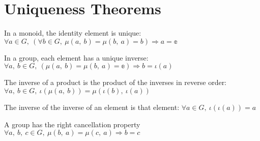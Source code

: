 \section{Uniqueness Theorems}

\begin{theorem}
    \label{theorem : identity_uniqueness}
    \leanok
    In a monoid, the identity element is unique:
    $\forall a \in G, ~(\forall b \in G, ~\mu(a,~ b) = \mu(b,~ a) = b)
    \Rightarrow a = \mathbb{e}$
  \end{theorem}

\begin{theorem}
    \label{theorem : inverse_uniqueness}
    \leanok
    In a group, each element has a unique inverse:
    $\forall a,~ b \in G,~ (\mu(a,~ b) = \mu(b,~ a) = \mathbb{e}) \Rightarrow b
     = \iota(a)$
  \end{theorem}

\begin{theorem}
  \label{theorem : shoes_and_socks}
  \leanok
  The inverse of a product is the product of the inverses in reverse order:
  $\forall a,~ b \in G,~ \iota(\mu(a,~ b)) = \mu(\iota(b),~ \iota(a))$
\end{theorem}

\begin{theorem}
  \label{theorem : inv_inv}
  \leanok
  The inverse of the inverse of an element is that element:
  $\forall a \in G,~ \iota(\iota(a)) = a$
\end{theorem}

\begin{theorem}
  \label{definition : right_cancel}
  \leanok
  A group has the right cancellation property
  $\forall a, ~b, ~c \in G,~ \mu(b,~ a) = \mu(c,~ a) \Rightarrow b = c$
\end{theorem}
